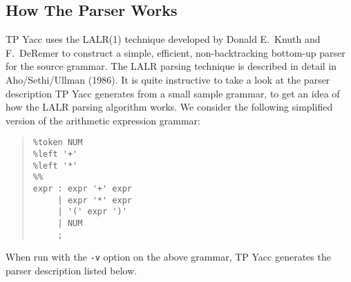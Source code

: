 \subsection{How The Parser Works}

TP Yacc uses the LALR(1) technique developed by Donald E.\ Knuth and F.\
DeRemer to construct a simple, efficient, non-backtracking bottom-up
parser for the source grammar. The LALR parsing technique is described
in detail in Aho/Sethi/Ullman (1986). It is quite instructive to take a
look at the parser description TP Yacc generates from a small sample
grammar, to get an idea of how the LALR parsing algorithm works. We
consider the following simplified version of the arithmetic expression
grammar:

\begin{quote}\begin{verbatim}
%token NUM
%left '+'
%left '*'
%%
expr : expr '+' expr
     | expr '*' expr
     | '(' expr ')'
     | NUM
     ;
\end{verbatim}\end{quote}

When run with the \verb"-v" option on the above grammar, TP Yacc generates
the parser description listed below.

